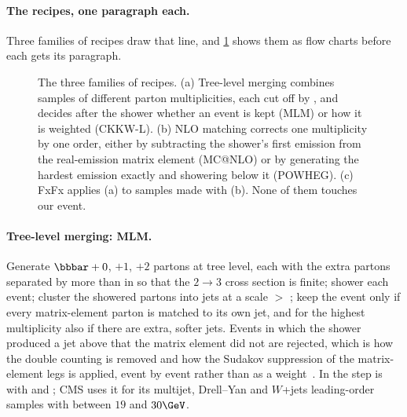 \paragraph{The recipes, one paragraph each.}
\label{sec:whose_child:recipes}
Three families of recipes draw that line, and \cref{fig:whose_child:recipes}
shows them as flow charts before each gets its paragraph.

\begin{figure}[htbp]\centering
\resizebox{\textwidth}{!}{}
\caption[Tree-level merging, NLO matching and FxFx as flow charts]{The three families of recipes. (a) Tree-level merging combines samples of different parton multiplicities, each cut off by , and decides after the shower whether an event is kept (MLM) or how it is weighted (CKKW-L). (b) NLO matching corrects one multiplicity by one order, either by subtracting the shower's first emission from the real-emission matrix element (MC@NLO) or by generating the hardest emission exactly and showering below it (POWHEG). (c) FxFx applies (a) to samples made with (b). None of them touches our event.}
\label{fig:whose_child:recipes}
\end{figure}

\paragraph{Tree-level merging: MLM.} Generate $\bbbar+0$, $+1$, $+2$ partons
at tree level, each with the extra partons separated by more than
 in \kt so that the $2\to3$ cross section is finite; shower
each event; cluster the showered partons into \kt jets at a scale
 $>$ ; keep the event only if every matrix-element
parton is matched to its own jet, and for the highest multiplicity also if
there are extra, softer jets. Events in which the shower produced a jet
above  that the matrix element did not are rejected, which is how
the double counting is removed and how the Sudakov suppression of the
matrix-element legs is applied, event by event rather than as a
weight~\cite{Mangano:2006rw,Alwall:2007fs}. In \PYTHIA the step is
 with  and
; CMS uses it for its \MG multijet, Drell--Yan and
$W$+jets leading-order samples with  between $19$ and $30\GeV$.

